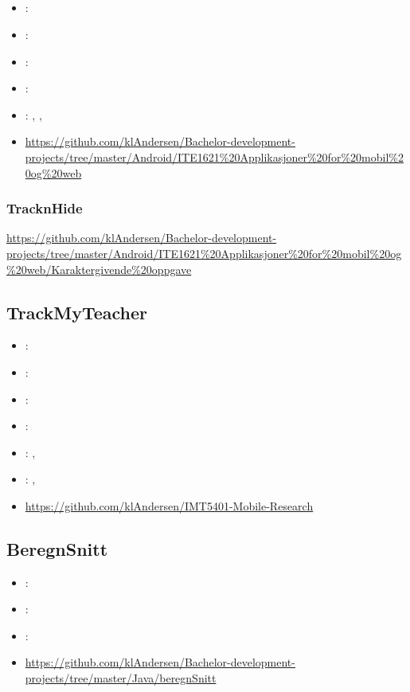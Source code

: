 \subsection[Android course]{}
\label{sec:android_course}
\begin{itemize} 
	\item {}: 
	\item {}: 
	\item {}: 
	\item {}: 
	\item {}: , , 
	\item {} \url{https://github.com/klAndersen/Bachelor-development-projects/tree/master/Android/ITE1621%20Applikasjoner%20for%20mobil%20og%20web}
\end{itemize} 

\subsubsection{TracknHide}
\label{sec:tracknhide}
 \url{https://github.com/klAndersen/Bachelor-development-projects/tree/master/Android/ITE1621%20Applikasjoner%20for%20mobil%20og%20web/Karaktergivende%20oppgave}

\subsection{TrackMyTeacher}
\label{sec:trackmyteacher}
\begin{itemize} 
	\item {}: 
	\item {}: 
	\item {}: 
	\item {}: 
	\item {}: , 
	\item {}: , 
	\item {} \url{https://github.com/klAndersen/IMT5401-Mobile-Research}
\end{itemize} 

\subsection{BeregnSnitt}
\label{sec:beregnsnitt}
\begin{itemize} 
	\item {}: 
	\item {}: 
	\item {}: 
	\item {} \url{https://github.com/klAndersen/Bachelor-development-projects/tree/master/Java/beregnSnitt}
\end{itemize} 

